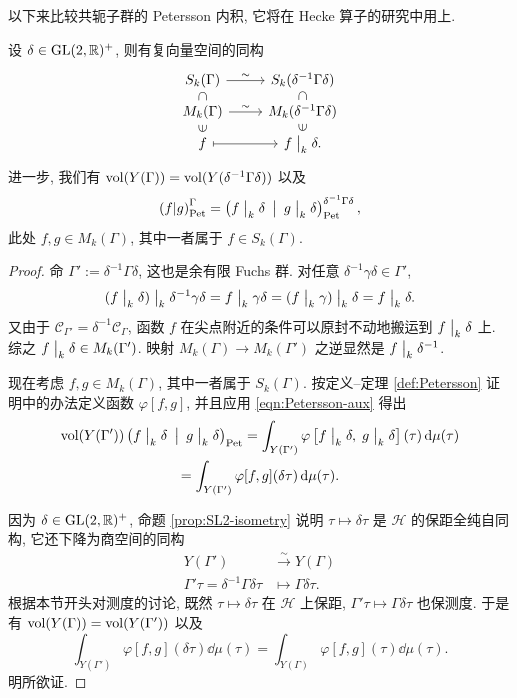 以下来比较共轭子群的 Petersson 内积, 它将在 Hecke 算子的研究中用上.
\begin{lemma}\label{prop:transport-conjugation}
	设 $\delta \in \operatorname{GL}(2,\mathbb{R})^+$, 则有复向量空间的同构
	\[\begin{tikzcd}[row sep=tiny]
		S_k(\Gamma) \arrow[r, "\sim"] \arrow[phantom, d, "\subset" sloped] & S_k(\delta^{-1} \Gamma \delta) \arrow[phantom, d, "\subset" sloped] \\
		M_k(\Gamma) \arrow[r, "\sim"] & M_k(\delta^{-1} \Gamma \delta) \\
		f \arrow[mapsto, r] \arrow[phantom, u, "\in" sloped] & f \modact{k} \delta \arrow[phantom, u, "\in" sloped].
	\end{tikzcd}\]
	进一步, 我们有 $\operatorname{vol}(Y(\Gamma)) = \operatorname{vol}(Y(\delta^{-1}\Gamma\delta))$ 以及
	\[ \left( f \middle| g \right)_{\mathrm{Pet}}^\Gamma = \left( f \;\big|_{k} \; \delta\enspace \middle| \enspace g \;\big|_{k} \; \delta \right)_{\mathrm{Pet}}^{\delta^{-1}\Gamma\delta}, \]
	此处 $f,g \in M_k(\Gamma)$, 其中一者属于 $f \in S_k(\Gamma)$.
\end{lemma}
\begin{proof}
	命 $\Gamma' := \delta^{-1}\Gamma\delta$, 这也是余有限 Fuchs 群. 对任意 $\delta^{-1}\gamma \delta \in \Gamma'$,
	\[ (f \;\big|_{k} \; \delta) \;\big|_{k} \; \delta^{-1}\gamma\delta = f \;\big|_{k} \; \gamma\delta = (f \;\big|_{k} \; \gamma) \;\big|_{k} \; \delta = f \;\big|_{k} \; \delta. \]
	又由于 $\mathcal{C}_{\Gamma'} = \delta^{-1} \mathcal{C}_\Gamma$, 函数 $f$ 在尖点附近的条件可以原封不动地搬运到 $f \;\big|_{k} \; \delta$ 上. 综之 $f \;\big|_{k} \; \delta \in M_k(\Gamma')$. 映射 $M_k(\Gamma) \to M_k(\Gamma')$ 之逆显然是 $f \;\big|_{k} \; \delta^{-1}$.
	
	现在考虑 $f, g \in M_k(\Gamma)$, 其中一者属于 $S_k(\Gamma)$. 按定义--定理 \ref{def:Petersson} 证明中的办法定义函数 $\varphi[f, g]$, 并且应用 \eqref{eqn:Petersson-aux} 得出
	\begin{multline*}
		\operatorname{vol}(Y(\Gamma')) \left(  f \;\big|_{k} \; \delta\enspace \middle| \enspace g \;\big|_{k} \; \delta \right)_{\mathrm{Pet}} = \int_{Y(\Gamma')} \varphi\left[ f \;\big|_{k} \; \delta,\; g \;\big|_{k} \; \delta \right](\tau) \mathop{}\!\mathrm{d}\mu(\tau) \\
		= \int_{Y(\Gamma')} \varphi[f,g](\delta\tau) \mathop{}\!\mathrm{d}\mu(\tau).
	\end{multline*}
	
	因为 $\delta \in \operatorname{GL}(2,\mathbb{R})^+$, 命题 \ref{prop:SL2-isometry} 说明 $\tau \mapsto \delta\tau$ 是 $\mathcal{H}$ 的保距全纯自同构, 它还下降为商空间的同构
	\begin{align*}
		Y(\Gamma') & \stackrel{\sim}{\longrightarrow} Y(\Gamma) \\
		\Gamma'\tau = \delta^{-1}\Gamma\delta\tau & \longmapsto \Gamma\delta\tau.
	\end{align*}
	根据本节开头对测度的讨论, 既然 $\tau \mapsto \delta\tau$ 在 $\mathcal{H}$ 上保距, $\Gamma'\tau \mapsto \Gamma\delta\tau$ 也保测度. 于是有 $\operatorname{vol}(Y(\Gamma)) = \operatorname{vol}(Y(\Gamma'))$ 以及
	\[ \int_{Y(\Gamma')} \varphi[f,g](\delta\tau) \dd\mu(\tau) = \int_{Y(\Gamma)} \varphi[f,g](\tau) \dd\mu(\tau). \]
	明所欲证.
\end{proof}

